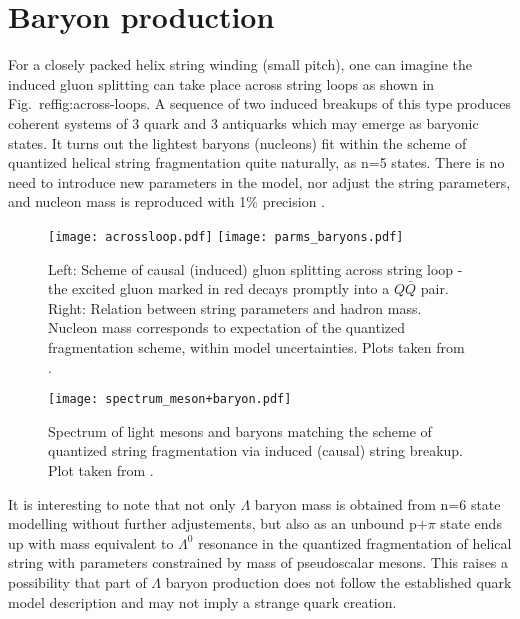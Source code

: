 \documentclass[Physsubmission, Phys]{SciPost}
\begin{document}
\section{Baryon production}

   For a closely packed helix string winding (small pitch), one can
   imagine the induced gluon splitting can take place across string
   loops as shown in Fig.~ref{fig:across-loops}.  A sequence of two
   induced breakups of this type produces coherent systems of 3 quark
   and 3 antiquarks which may emerge as baryonic states. It turns out
   the lightest baryons (nucleons) fit within the scheme of quantized
  helical string fragmentation quite naturally, as n=5 states. There is no need to
  introduce new parameters in the model, nor adjust the string
  parameters, and nucleon mass is reproduced with 1\% precision \cite{baryons}.
  
\begin{figure}[h]
\centering
\texttt{[image: acrossloop.pdf]}
\texttt{[image: parms\_baryons.pdf]}
\caption{ Left: Scheme of causal (induced) gluon splitting across
  string loop - the
  excited gluon marked in red decays promptly into a $Q\bar{Q}$
  pair. Right: Relation between string parameters and hadron mass. Nucleon mass corresponds to expectation of the
  quantized fragmentation scheme, within model uncertainties. Plots taken from \cite{baryons}.
\label{fig:across-loops}}
\end{figure}
 
\begin{figure}[h]
\centering
\texttt{[image: spectrum\_meson+baryon.pdf]}
\caption{ Spectrum of light mesons and baryons matching the scheme of
  quantized string fragmentation via induced (causal) string breakup. Plot taken from \cite{baryons}.
\label{fig:lambda}} 
\end{figure}

 It is interesting to note \cite{baryons}  that not only $\Lambda$
 baryon mass is obtained from n=6 state modelling without further
 adjustements,
 but also as an unbound p+$\pi$ state  ends up with mass equivalent
 to $\Lambda^0$ resonance in the quantized fragmentation of helical
 string with parameters constrained by mass of pseudoscalar mesons.
  This raises a possibility that part of  $\Lambda$ baryon
   production does not follow the established quark model description
   and may not imply a strange quark creation.
\end{document}
